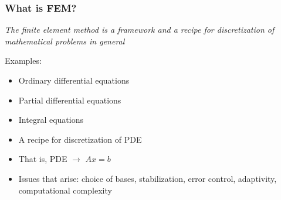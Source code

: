 \begin{frame}
  \frametitle{What is FEM?}

  \emph{The finite element method is a framework and a recipe for
    discretization of mathematical problems in general}

  Examples: 
  \begin{itemize}
  \item
    Ordinary differential equations
  \item
    Partial differential equations
  \item
    Integral equations
  \end{itemize}

  \begin{itemize}
  \item
    A recipe for discretization of PDE
  \item
    That is, PDE $\rightarrow$ $Ax = b$
  \item
    Issues that arise: choice of bases, stabilization, error control, adaptivity, computational complexity
  \end{itemize}

\end{frame}
